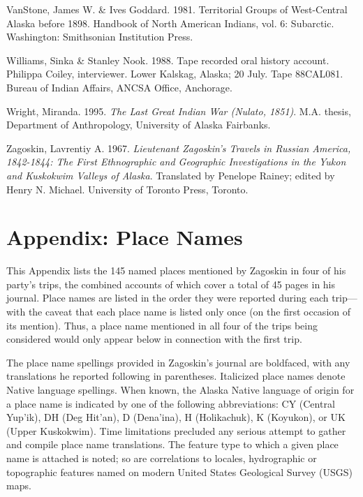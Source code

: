 \begin{hang}
VanStone, James W. \& Ives Goddard. 1981. Territorial Groups of West-Central Alaska before 1898. Handbook of North American Indians, vol. 6: Subarctic. Washington: Smithsonian Institution Press.

Williams, Sinka \& Stanley Nook. 1988. Tape recorded oral history account. Philippa Coiley, interviewer. Lower Kalskag, Alaska; 20 July. Tape 88CAL081. Bureau of Indian Affairs, ANCSA Office, Anchorage.

Wright, Miranda. 1995. \textit{The Last Great Indian War (Nulato, 1851)}. M.A. thesis, Department of Anthropology, University of Alaska Fairbanks.

Zagoskin, Lavrentiy A. 1967. \textit{Lieutenant Zagoskin’s Travels in Russian America, 1842-1844: The First Ethnographic and Geographic Investigations in the Yukon and Kuskokwim Valleys of Alaska}.  Translated by Penelope Rainey; edited by Henry N. Michael.  University of Toronto Press, Toronto.


\end{hang}



\clearpage
\section*{Appendix: Place Names}



This Appendix lists the 145 named places mentioned by Zagoskin in four of his party’s trips, the combined accounts of which cover a total of 45 pages in his journal. Place names are listed in the order they were reported during each trip—with the caveat that each place name is listed only once (on the first occasion of its mention). Thus, a place name mentioned in all four of the trips being considered would only appear below in connection with the first trip.



The place name spellings provided in Zagoskin’s journal are boldfaced, with any translations he reported following in parentheses. Italicized place names denote Native language spellings. When known, the Alaska Native language of origin for a place name is indicated by one of the following abbreviations: CY (Central Yup’ik), DH (Deg Hit’an), D (Dena’ina), H (Holikachuk), K (Koyukon), or UK (Upper Kuskokwim). Time limitations precluded any serious attempt to gather and compile place name translations. The feature type to which a given place name is attached is noted; so are correlations to locales, hydrographic or topographic features named on modern United States Geological Survey (USGS) maps.



